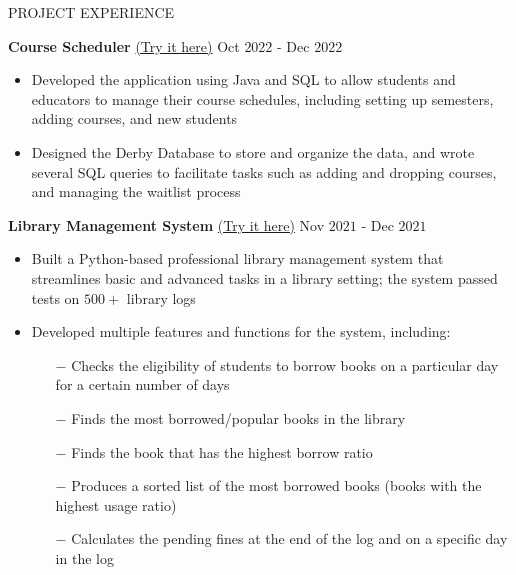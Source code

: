 \documentclass{resume} %
\begin{document}

\begin{rSection}{PROJECT EXPERIENCE}

\textbf{Course Scheduler }{\href{https://github.com/harshitjain17/OOP-with-Web-based-Applications-in-Java-/tree/main/CourseSchedulerHarshitJainhmj5262}{(Try it here)}} \hfill Oct $2022$ - Dec $2022$
\begin{itemize}
    \itemsep -3pt {}
    \item Developed the application using Java and SQL to allow students and educators to manage their course schedules, including setting up semesters, adding courses, and new students
    \item Designed the Derby Database to store and organize the data, and wrote several SQL queries to facilitate tasks such as adding and dropping courses, and managing the waitlist process
\end{itemize}


\textbf{Library Management System }{\href{https://github.com/harshitjain17/Library-Management-System}{(Try it here)}} \hfill Nov $2021$ - Dec $2021$
\begin{itemize}
    \itemsep -3pt {}
    \item Built a Python-based professional library management system that streamlines basic and advanced tasks in a library setting; the system passed tests on $500+$ library logs
    \item Developed multiple features and functions for the system, including:
    \begin{itemize}
        \itemsep -3pt {}
        \item[$-$] Checks the eligibility of students to borrow books on a particular day for a certain number of days
        \item[$-$] Finds the most borrowed/popular books in the library
        \item[$-$] Finds the book that has the highest borrow ratio
        \item[$-$] Produces a sorted list of the most borrowed books (books with the highest usage ratio)
        \item[$-$] Calculates the pending fines at the end of the log and on a specific day in the log
    \end{itemize}
\end{itemize}

\end{rSection} 
\end{document}
